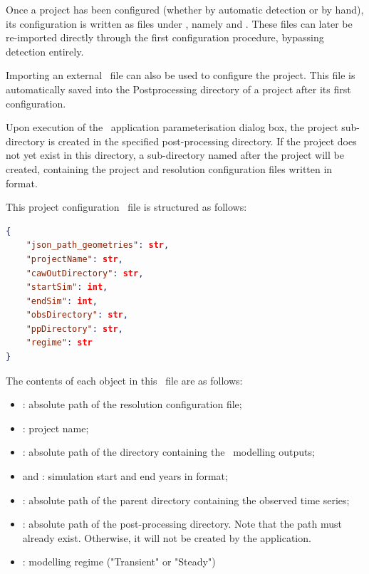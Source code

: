 Once a project has been configured (whether by automatic detection or by
hand), its configuration is written as  files under
, namely
 and
. These files can later be
re-imported directly through the first configuration procedure, bypassing
detection entirely. 

Importing an external \json~file can also be used to configure
the project. This file is automatically saved into the Postprocessing directory of a project after its first configuration. 

Upon execution of the \cwv~application parameterisation dialog box, the
project sub-directory is created in the specified post-processing directory.
If the project does not yet exist in this directory, a sub-directory named after
the project will be created, containing the project and resolution configuration files
written in  format.


 This project configuration \json~file is structured as follows:

\begin{lstlisting}[language=json]
{
    "json_path_geometries": str,
    "projectName": str, 
    "cawOutDirectory": str,
    "startSim": int,
    "endSim": int,
    "obsDirectory": str,
    "ppDirectory": str, 
    "regime": str
}
\end{lstlisting}

\vspace{-0.6cm}
The contents of each object in this \json~file are as follows:
\begin{itemize}
    \item {}: absolute path of the resolution
        configuration file;

    \item {}: project name;

    \item {}: absolute path of the directory containing the
        \cawaqs~modelling outputs;

    \item {} and : simulation start and end years
        in  format;

    \item {}: absolute path of the parent directory containing the
        observed time series;

    \item {}: absolute path of the post-processing directory. Note
        that the path must already exist. Otherwise, it will not be
        created by the application.

    \item {}: modelling regime ("Transient" or "Steady")
\end{itemize}
